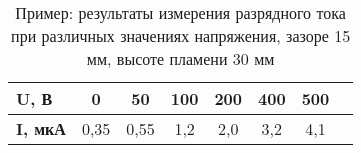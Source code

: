 \documentclass[a4paper, 12pt]{extarticle}
\begin{document}
\begin{table}[t]
\caption{Пример: результаты измерения разрядного тока при различных значениях напряжения, зазоре 15 мм, высоте пламени 30 мм \label{tab:example-exp}}
\begin{center}
\begin{tabular}{|l|c|c|c|c|c|c|c|}
\hline
\textbf{U, В}   & 0    & 50   & 100 & 200 & 400 & 500 \\ \hline
\textbf{I, мкА} & 0,35 & 0,55 & 1,2 & 2,0 & 3,2 & 4,1 \\ \hline
\end{tabular}
\end{center}
\end{table}
\end{document}
